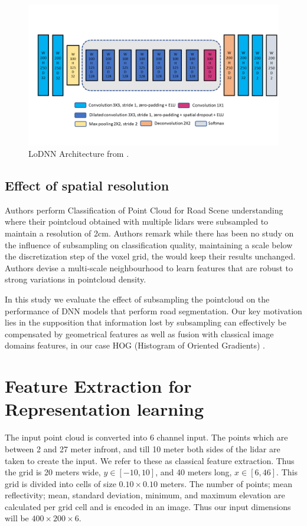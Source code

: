 \documentclass[10pt,twocolumn,letterpaper]{article}
\begin{document}
\begin{figure}
    \centering
    \includegraphics[width=0.85\linewidth]{loDNNArchitecture.png}
    \caption{LoDNN Architecture from \cite{lodnn2017}. }
    \label{fig:lodnn}
\end{figure}

\subsection{Effect of spatial resolution}
Authors \cite{roynard2018classification} perform Classification of Point Cloud for Road Scene understanding where their pointcloud obtained with multiple lidars were subsampled to maintain a resolution of 2cm. Authors remark while there has been no study on the influence of subsampling on classification quality, maintaining  a scale below the discretization step of the voxel grid, the would keep their results unchanged. Authors \cite{hackel2016fast} devise a multi-scale neighbourhood to learn features that are robust to strong variations in pointcloud density.

In this study we evaluate the effect of subsampling the pointcloud on the performance of DNN models that perform road segmentation. Our key motivation lies in the supposition that information lost by subsampling can effectively be compensated by geometrical features as well as fusion with classical image domains features, in our case HOG (Histogram of Oriented Gradients) \cite{dalal2005histograms}.

\section{Feature Extraction for Representation learning}

The input point cloud is converted into 6 channel input. The points which are between 2 and 27 meter infront, and till 10 meter both sides of the lidar are taken to create the input. We refer to these as classical feature extraction. Thus the grid is 20 meters wide, $y \in [−10, 10]$, and 40 meters long, $x \in  [6, 46]$. This grid is divided into cells of size $0.10 \times 0.10$ meters. The number of points; mean reflectivity; mean, standard deviation, minimum, and maximum elevation are calculated per grid cell and is encoded in an image. Thus our input dimensions will be $400 \times 200 \times 6$. 
\end{document}
